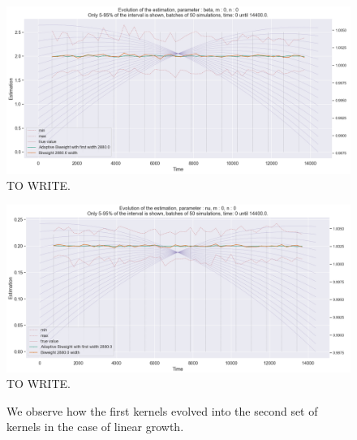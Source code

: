 \begin{figure}
\centering
\includegraphics[width = 0.90 \textwidth]{../imag/chap3/0/B.png}
\caption{TO WRITE.}
\label{fig:first_estimate_0_beta}
\end{figure}

\begin{figure}
\centering
\includegraphics[width = 0.90 \textwidth]{../imag/chap3/0/C.png}
\caption{TO WRITE.}
\label{fig:first_estimate_0_nu}
\end{figure}











\begin{figure}
\centering
{} 
\caption{We observe how the first kernels evolved into the second set of kernels in the case of linear growth.}
\label{fig:compar_kernels_1}
\end{figure}


